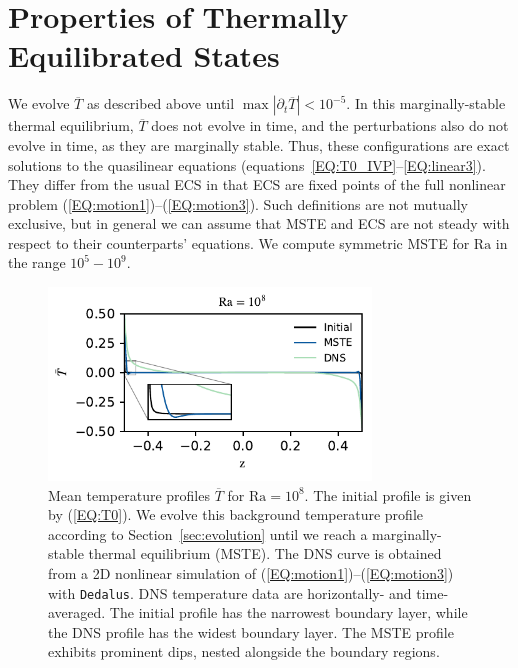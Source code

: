 \documentclass[reprint,amsmath,amssymb,aps,nofootinbib]{revtex4-1}
\newcommand\Ra{\mathrm{Ra}}
\newcommand{\eq}[1]{(\ref{#1})}
\newcommand{\eqss}[2]{(\ref{#1})--(\ref{#2})}
\begin{document}
\section{Properties of Thermally Equilibrated States}\label{sec:properties}
We evolve $\overline{T}$ as described above until $\max|\partial_{t}\overline{T}| < 10^{-5}$.
In this marginally-stable thermal equilibrium, $\overline{T}$ does not evolve in time, and the perturbations also do not evolve in time, as they are marginally stable.
Thus, these configurations are exact solutions to the quasilinear equations (equations~\ref{EQ:T0_IVP}--\ref{EQ:linear3}).
They differ from the usual ECS in that ECS are fixed points of the full nonlinear problem \eqss{EQ:motion1}{EQ:motion3}. 
Such definitions are not mutually exclusive, but in general we can assume that MSTE and ECS are not steady with respect to their counterparts' equations.
We compute symmetric MSTE for $\Ra$ in the range $10^5 - 10^9$.

\begin{figure}
    \centering
    \includegraphics[width=3.375in]{T_profs_na.pdf}
    \caption{Mean temperature profiles $\overline{T}$ for $\Ra = 10^8$. 
    The initial profile is given by \eq{EQ:T0}. 
    We evolve this background temperature profile according to Section~\ref{sec:evolution} until we reach a marginally-stable thermal equilibrium (MSTE).
    The DNS curve is obtained from a 2D nonlinear simulation of \eqss{EQ:motion1}{EQ:motion3} with \texttt{Dedalus}.
    DNS temperature data are horizontally- and time-averaged.
    The initial profile has the narrowest boundary layer, while the DNS profile has the widest boundary layer.
    The MSTE profile exhibits prominent dips, nested alongside the boundary regions. }
    \label{fig:T0_profiles}
\end{figure}
\end{document}
